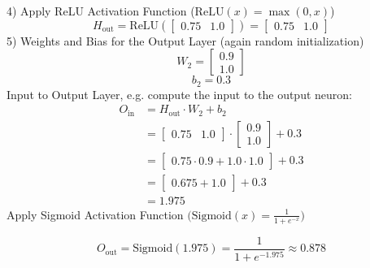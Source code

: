 \documentclass{article}
\begin{document}
%
4) Apply ReLU Activation Function ($\text{ReLU}(x) = \max(0, x)$)
\[
H_\text{out} = \text{ReLU}( \begin{bmatrix} 
0.75 & 1.0 
\end{bmatrix} )
= \begin{bmatrix} 
0.75 & 1.0 
\end{bmatrix}
\]
%
5) Weights and Bias for the Output Layer (again random initialization)
\[
W_2 = \begin{bmatrix} 
0.9 \\ 
1.0 
\end{bmatrix}
\]
\[
b_2 = 0.3
\]
%
Input to Output Layer, e.g. compute the input to the output neuron:
\begin{align*}
O_\text{in} &= H_\text{out} \cdot W_2 + b_2 \\
&= \begin{bmatrix} 
0.75 & 1.0 
\end{bmatrix} \cdot \begin{bmatrix} 
0.9 \\ 
1.0 
\end{bmatrix} + 0.3 \\
&= \begin{bmatrix} 
0.75 \cdot 0.9 + 1.0 \cdot 1.0 
\end{bmatrix} + 0.3 \\
&= \begin{bmatrix} 
0.675 + 1.0 
\end{bmatrix} + 0.3 \\
&= 1.975
\end{align*}
%
Apply Sigmoid Activation Function $\big( \text{Sigmoid}(x) = \frac{1}{1 + e^{-x}} \big)$

\[
O_\text{out} = \text{Sigmoid}(1.975) = \frac{1}{1 + e^{-1.975}} \approx 0.878
\]
\end{document}
